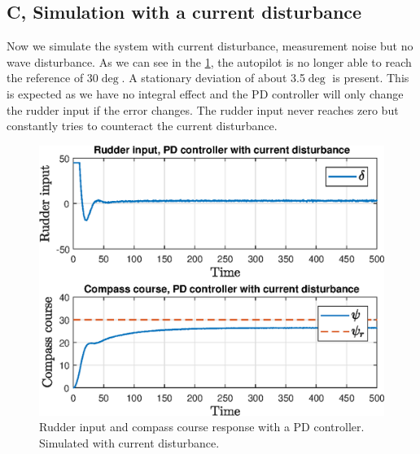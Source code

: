 \subsection{C, Simulation with a current disturbance}
Now we simulate the system with current disturbance, measurement noise but no wave disturbance. As we can see in the \cref{fig:p3pc_rudder_heading}, the autopilot is no longer able to reach the reference of 30$\deg$. A stationary deviation of about 3.5$\deg$ is present. This is expected as we have no integral effect and the PD controller will only change the rudder input if the error changes. The rudder input never reaches zero but constantly tries to counteract the current disturbance.
\begin{figure}
    \centering
    \includegraphics[width = 1.00\textwidth]{figures/plots/P5p3c_rudder_heading.eps}
    \caption{Rudder input and compass course response with a PD controller. Simulated with current disturbance.}
    \label{fig:p3pc_rudder_heading}
\end{figure}
